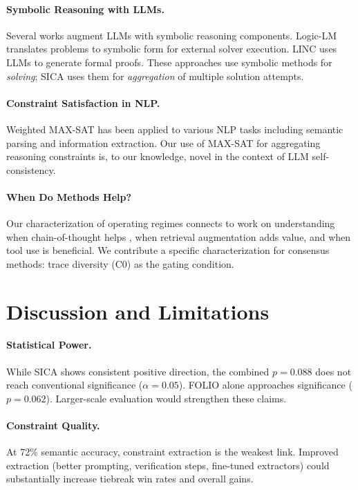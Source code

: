 \documentclass[11pt,a4paper]{article}
\begin{document}
\paragraph{Symbolic Reasoning with LLMs.} Several works augment LLMs with symbolic reasoning components. Logic-LM \cite{pan2023logiclm} translates problems to symbolic form for external solver execution. LINC \cite{olausson2023linc} uses LLMs to generate formal proofs. These approaches use symbolic methods for \emph{solving}; SICA uses them for \emph{aggregation} of multiple solution attempts.

\paragraph{Constraint Satisfaction in NLP.} Weighted MAX-SAT has been applied to various NLP tasks including semantic parsing and information extraction. Our use of MAX-SAT for aggregating reasoning constraints is, to our knowledge, novel in the context of LLM self-consistency.

\paragraph{When Do Methods Help?} Our characterization of operating regimes connects to work on understanding when chain-of-thought helps \cite{wei2022chainofthought}, when retrieval augmentation adds value, and when tool use is beneficial. We contribute a specific characterization for consensus methods: trace diversity (C0) as the gating condition.

\section{Discussion and Limitations}
\label{sec:limitations}

\paragraph{Statistical Power.} While SICA shows consistent positive direction, the combined $p{=}0.088$ does not reach conventional significance ($\alpha{=}0.05$). FOLIO alone approaches significance ($p{=}0.062$). Larger-scale evaluation would strengthen these claims.

\paragraph{Constraint Quality.} At 72\% semantic accuracy, constraint extraction is the weakest link. Improved extraction (better prompting, verification steps, fine-tuned extractors) could substantially increase tiebreak win rates and overall gains.
\end{document}
